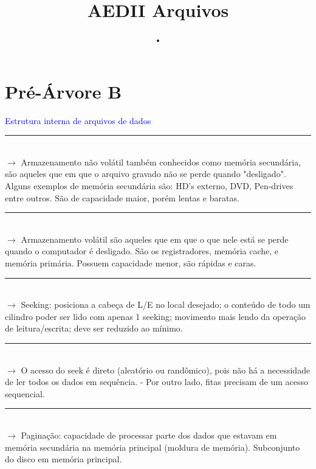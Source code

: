 \documentclass[a4paper, 12pt]{article}
\begin{document}
\title{AEDII Arquivos}
\author{•}
\date{}
\maketitle

\section{Pré-Árvore B}

\textcolor{white}{               }

\textcolor{blue}{Estrutura interna de arquivos de dados}\\

\rule{12cm}{0.4pt}\\

$\rightarrow$ Armazenamento não volátil também conhecidos como memória secundária, são aqueles que em que o arquivo gravado não se perde quando "desligado". Alguns exemplos de memória secundária são: HD's externo, DVD, Pen-drives entre outros. São de capacidade maior, porém lentas e baratas.\\

\rule{12cm}{0.4pt}\\

$\rightarrow$ Armazenamento volátil são aqueles que em que o que nele está se perde quando o computador é desligado. São os registradores, memória cache, e memória primária. Possuem capacidade menor, são rápidas e caras.\\

\rule{12cm}{0.4pt}\\

$\rightarrow$ Seeking: posiciona a cabeça de L/E no local desejado; o conteúdo de todo um cilindro poder ser lido com apenas 1 seeking; movimento mais lendo da operação de leitura/escrita; deve ser reduzido ao mínimo.\\

\rule{12cm}{0.4pt}\\

$\rightarrow$ O acesso do seek é direto (aleatório ou randômico), pois não há a necessidade de ler todos os dados em sequência. - Por outro lado, fitas precisam de um acesso sequencial.\\

\rule{12cm}{0.4pt}\\

$\rightarrow$ Paginação: capacidade de processar parte dos dados que estavam em memória secundária na memória principal (moldura de memória). Subconjunto do disco em memória principal.\\
\end{document}
